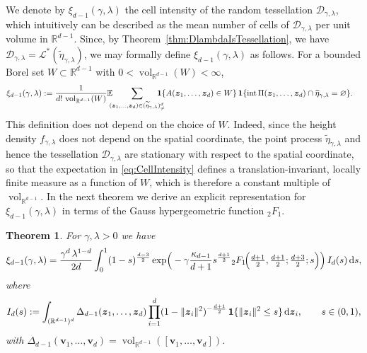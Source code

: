 \documentclass[11pt,a4paper]{article}
\theoremstyle{plain}
\newtheorem{theorem}{Theorem}
\theoremstyle{definition}
\theoremstyle{remark}
\newcommand{\dint}{\textup{d}}
\newcommand{\vol}{\mathop{\mathrm{vol}}\nolimits}
\newcommand{\bz}{\boldsymbol{z}}
\newcommand{\bv}{\boldsymbol{v}}
\def\EE{\mathbb{E}}
\def\RR{\mathbb{R}}
\def\cD{\mathcal{D}}
\begin{document}
We denote by $\xi_{d-1}(\gamma,\lambda)$ the cell intensity of the random tessellation $\cD_{\gamma,\lambda}$, which intuitively can be described as the mean number of cells of $\cD_{\gamma,\lambda}$ per unit volume in $\RR^{d-1}$. Since, by Theorem~\ref{thm:DlambdaIsTessellation}, we have $\cD_{\gamma,\lambda}=\mathcal{L}^*(\widetilde{\eta}_{\gamma,\lambda})$, we may formally define $\xi_{d-1}(\gamma,\lambda)$ as follows. For a bounded Borel set $W\subset\RR^{d-1}$ with $0<\vol_{\RR^{d-1}}(W)<\infty$,
\begin{align}
	\xi_{d-1}(\gamma,\lambda) & := \frac{1}{d!\,\vol_{\RR^{d-1}}(W)}\EE\hspace{-0.2cm}\sum_{(\bz_1,\ldots,\bz_d)\in(\widetilde\eta_{\gamma,\lambda})_{\neq}^d}\hspace{-0.4cm}{\bf 1}\{A(\bz_1,\ldots,\bz_d)\in W\}
	\, {\bf 1}\{{\rm int}\,\Pi(\bz_1,\ldots,\bz_d)\cap\widetilde\eta_{\gamma,\lambda}=\varnothing\}.\label{eq:CellIntensity}
\end{align}
This definition does not depend on the choice of $W$. Indeed, since the height density $f_{\gamma,\lambda}$ does not depend on the spatial coordinate, the point process $\widetilde\eta_{\gamma,\lambda}$ and hence the tessellation $\cD_{\gamma,\lambda}$ are stationary with respect to the spatial coordinate, so that the expectation in \eqref{eq:CellIntensity} defines a translation-invariant, locally finite measure as a function of $W$, which is therefore a constant multiple of $\vol_{\RR^{d-1}}$.
In the next theorem we derive an explicit representation for $\xi_{d-1}(\gamma,\lambda)$ in terms of the Gauss hypergeometric function $_2F_1$.



\begin{theorem}\label{thm:CellIntensity}
	For $\gamma,\lambda>0$ we have
	\[
		\xi_{d-1}(\gamma,\lambda) =\frac{\gamma^d\,\lambda^{1-d}}{2d}
		\int_0^1 (1-s)^{\frac{d-3}{2}}
		\exp\!\Big(
		-\gamma\frac{\kappa_{d-1}}{d+1}
		s^{\frac{d+1}{2}}
		{}_2F_1\!\Big(\tfrac{d+1}{2},\tfrac{d+1}{2};\tfrac{d+3}{2};s\Big)
		\Big)\,I_d(s)\,\dint s,
	\]
	where
	\[
		I_d(s) := \int_{(\RR^{d-1})^d}
		\Delta_{d-1}(\bz_1,\ldots,\bz_d)
		\prod_{i=1}^d(1-\|\bz_i\|^2)^{-\frac{d+1}{2}}
		\,{\bf 1}\{\|\bz_i\|^2\le s\}
		\,\dint\bz_i,\qquad s\in(0,1),
	\]
	with $\Delta_{d-1}(\bv_1,\ldots,\bv_d)=\vol_{\RR^{d-1}}([\bv_1,\ldots,\bv_d])$.
\end{theorem}
\end{document}
